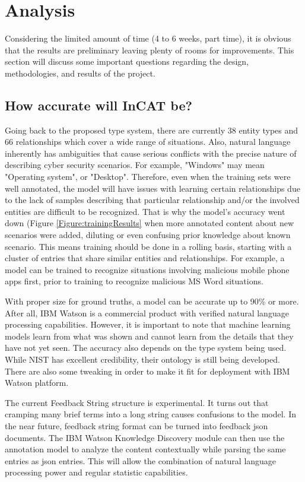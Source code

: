 \documentclass[conference]{IEEEtran}
\begin{document}
\section{Analysis}
Considering the limited amount of time (4 to 6 weeks, part time), it is obvious that the results are preliminary leaving plenty of rooms for improvements. This section will discuss some important questions regarding the design, methodologies, and results of the project.

\subsection{How accurate will InCAT be?}
Going back to the proposed type system, there are currently 38 entity types and 66 relationships which cover a wide range of situations. Also, natural language inherently has ambiguities that cause serious conflicts with the precise nature of describing cyber security scenarios. For example, "Windows" may mean "Operating system", or "Desktop". Therefore, even when the training sets were well annotated, the model will have issues with learning certain relationships due to the lack of samples describing that particular relationship and/or the involved entities are difficult to be recognized. That is why the model's accuracy went down (Figure \ref{Figure:trainingResults} when more annotated content about new scenarios were added, diluting or even confusing prior knowledge about known scenario. This means training should be done in a rolling basis, starting with a cluster of entries that share similar entities and relationships. For example, a model can be trained to recognize situations involving malicious mobile phone apps first, prior to training to recognize malicious MS Word situations.

With proper size for ground truths, a model can be accurate up to 90\% or more. After all, IBM Watson is a commercial product with verified natural language processing capabilities. However, it is important to note that machine learning models learn from what was shown and cannot learn from the details that they have not yet seen. The accuracy also depends on the type system being used. While NIST has excellent credibility, their ontology is still being developed. There are also some tweaking in order to make it fit for deployment with IBM Watson platform.

The current Feedback String structure is experimental. It turns out that cramping many brief terms into a long string causes confusions to the model. In the near future, feedback string format can be turned into feedback json documents. The IBM Watson Knowledge Discovery module can then use the annotation model to analyze the content contextually while parsing the same entries as json entries. This will allow the combination of natural language processing power and regular statistic capabilities.
\end{document}
